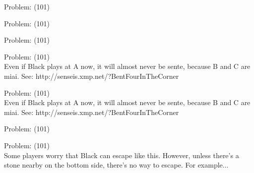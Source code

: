 \documentclass[11pt]{article}
\begin{document}
\begin{minipage}[t]{0.5\textwidth}
  {\centering
  
  Problem: (101)\\
  
  }
\end{minipage}
\begin{minipage}[t]{0.5\textwidth}
  {\centering
  
  Problem: (101)\\
  
  }
\end{minipage}
\begin{minipage}[t]{0.5\textwidth}
  {\centering
  
  Problem: (101)\\
  
  }
\end{minipage}
\begin{minipage}[t]{0.5\textwidth}
  {\centering
  
  Problem: (101)\\
  Even if Black plays at A now, it will almost never be sente, because B and C are miai. See: http://senseis.xmp.net/?BentFourInTheCorner\\
  }
\end{minipage}
\begin{minipage}[t]{0.5\textwidth}
  {\centering
  
  Problem: (101)\\
  Even if Black plays at A now, it will almost never be sente, because B and C are miai. See: http://senseis.xmp.net/?BentFourInTheCorner\\
  }
\end{minipage}
\begin{minipage}[t]{0.5\textwidth}
  {\centering
  
  Problem: (101)\\
  
  }
\end{minipage}
\begin{minipage}[t]{0.5\textwidth}
  {\centering
  
  Problem: (101)\\
  Some players worry that Black can escape like this. However, unless there's a stone nearby on the bottom side, there's no way to escape. For example...\\
  }
\end{minipage}
\end{document}
